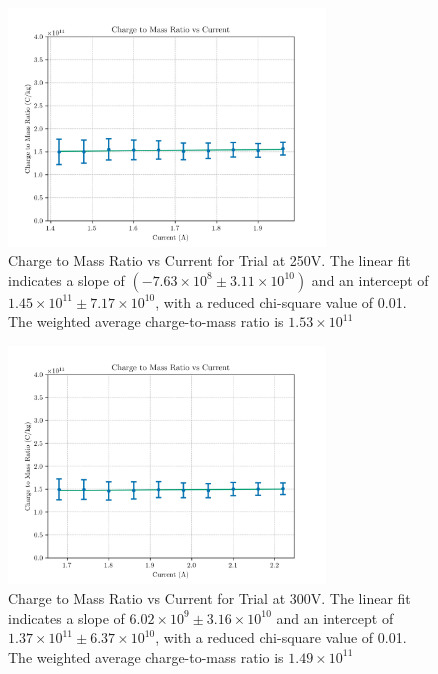 \documentclass{article}
\begin{document}
\begin{figure}[H]
    \centering
    \includegraphics[width=0.75\textwidth]{trial_250.png}
    \caption{Charge to Mass Ratio vs Current for Trial at 250V. The linear fit indicates a slope of \((-7.63 \times 10^{8} \pm 3.11 \times 10^{10})\) and an intercept of \(1.45 \times 10^{11} \pm 7.17 \times 10^{10}\), with a reduced chi-square value of 0.01. The weighted average charge-to-mass ratio is \(1.53 \times 10^{11}\)}
    \label{fig:trial250}
\end{figure}

\begin{figure}[H]
    \centering
    \includegraphics[width=0.75\textwidth]{trial_300.png}
    \caption{Charge to Mass Ratio vs Current for Trial at 300V. The linear fit indicates a slope of \(6.02 \times 10^{9} \pm 3.16 \times 10^{10}\) and an intercept of \(1.37 \times 10^{11} \pm 6.37 \times 10^{10}\), with a reduced chi-square value of 0.01. The weighted average charge-to-mass ratio is \(1.49 \times 10^{11}\)}
    \label{fig:trial300}
\end{figure}
\end{document}
